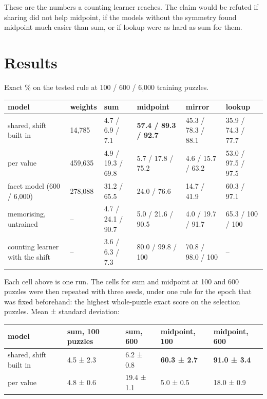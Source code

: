 These are the numbers a counting learner reaches. The claim would be refuted if sharing did not help midpoint, if the models without the symmetry found midpoint much easier than sum, or if lookup were as hard as sum for them.

\section{Results}\label{sec:7.4}

Exact \% on the tested rule at 100 / 600 / 6,000 training puzzles.

\begin{center}\small
\begin{tabularx}{\linewidth}{@{}YllYll@{}}
\toprule
model & weights & sum & midpoint & mirror & lookup \\
\midrule
shared, shift built in & 14,785 & 4.7 / 6.9 / 7.1 & \textbf{57.4 / 89.3 / 92.7} & 45.3 / 78.3 / 88.1 & 35.9 / 74.3 / 77.7 \\
per value & 459,635 & 4.9 / 19.3 / 69.8 & 5.7 / 17.8 / 75.2 & 4.6 / 15.7 / 63.2 & 53.0 / 97.5 / 97.5 \\
facet model (600 / 6,000) & 278,088 & 31.2 / 65.5 & 24.0 / 76.6 & 14.7 / 41.9 & 60.3 / 97.1 \\
memorising, untrained & – & 4.7 / 24.1 / 90.7 & 5.0 / 21.6 / 90.5 & 4.0 / 19.7 / 91.7 & 65.3 / 100 / 100 \\
counting learner with the shift & – & 3.6 / 6.3 / 7.3 & 80.0 / 99.8 / 100 & 70.8 / 98.0 / 100 & – \\
\bottomrule
\end{tabularx}
\end{center}

Each cell above is one run. The cells for sum and midpoint at 100 and 600 puzzles were then repeated with three seeds, under one rule for the epoch that was fixed beforehand: the highest whole-puzzle exact score on the selection puzzles. Mean ± standard deviation:

\begin{center}\small
\begin{tabular}{@{}lllll@{}}
\toprule
model & sum, 100 puzzles & sum, 600 & midpoint, 100 & midpoint, 600 \\
\midrule
shared, shift built in & 4.5 ± 2.3 & 6.2 ± 0.8 & \textbf{60.3 ± 2.7} & \textbf{91.0 ± 3.4} \\
per value & 4.8 ± 0.6 & 19.4 ± 1.1 & 5.0 ± 0.5 & 18.0 ± 0.9 \\
\bottomrule
\end{tabular}
\end{center}

